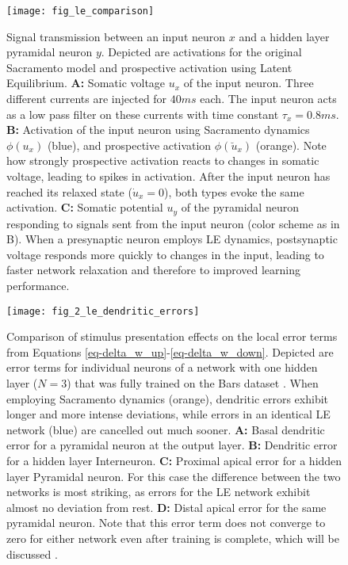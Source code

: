 \begin{figure}[t]
  \centering
  \texttt{[image: fig\_le\_comparison]}
  \caption{Signal transmission between an input neuron $x$ and a hidden layer pyramidal neuron $y$. Depicted are
    activations for the original Sacramento model and prospective activation using Latent Equilibrium. \textbf{A:}
    Somatic voltage $u_x$ of the input neuron. Three different currents are injected for $40ms$ each. The input neuron
    acts as a low pass filter on these currents with time constant $\tau_x = 0.8 ms$. \textbf{B:} Activation of the
    input neuron using Sacramento dynamics $\phi(u_x)$ (blue), and prospective activation $\phi(\breve{u}_x)$ (orange).
    Note how strongly prospective activation reacts to changes in somatic voltage, leading to spikes in activation.
    After the input neuron has reached its relaxed state ($\dot{u}_x = 0$), both types evoke the same activation.
    \textbf{C:} Somatic potential $u_y$ of the pyramidal neuron responding to signals sent from the input neuron (color
    scheme as in B). When a presynaptic neuron employs LE dynamics, postsynaptic voltage responds more quickly to
    changes in the input, leading to faster network relaxation and therefore to improved learning performance.}
  \label{fig-comparison-le}
\end{figure}


\begin{figure}[t]
  \centering
  \texttt{[image: fig\_2\_le\_dendritic\_errors]}
  \caption{Comparison of stimulus presentation effects on the local error terms from Equations
    \ref{eq-delta_w_up}-\ref{eq-delta_w_down}. Depicted are error terms for individual neurons of a network with one
    hidden layer ($N=3$) that was fully trained on the Bars dataset . When employing Sacramento dynamics
    (orange), dendritic errors exhibit longer and more intense deviations, while errors in an identical LE network
    (blue) are cancelled out much sooner. \textbf{A:} Basal dendritic error for a pyramidal neuron at the output layer.
    \textbf{B:} Dendritic error for a hidden layer Interneuron. \textbf{C:} Proximal apical error for a hidden layer
    Pyramidal neuron. For this case the difference between the two networks is most striking, as errors for the LE
    network exhibit almost no deviation from rest. \textbf{D:} Distal apical error for the same pyramidal neuron. Note
    that this error term does not converge to zero for either network even after training is complete, which will be
    discussed .}
  \label{fig-error-comp-le}
\end{figure}

